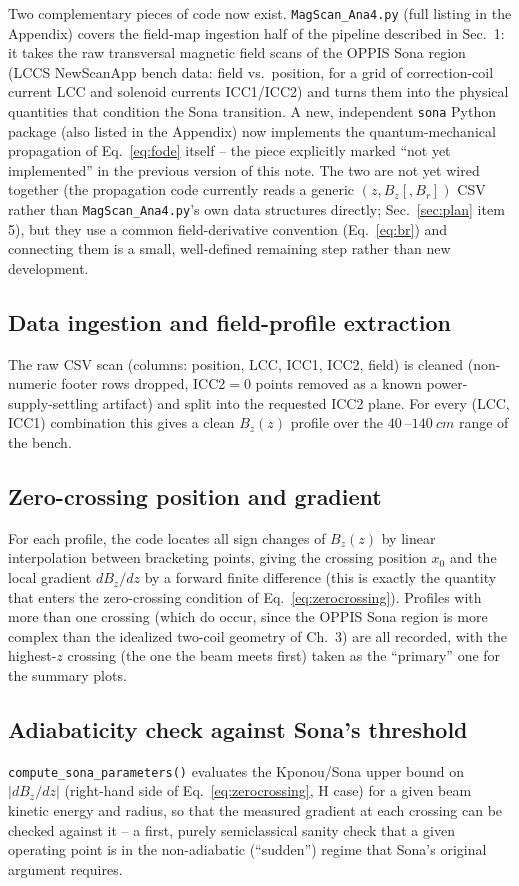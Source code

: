 \documentclass[11pt,a4paper]{article}
\begin{document}
Two complementary pieces of code now exist. \texttt{MagScan\_Ana4.py} (full
listing in the Appendix) covers the field-map ingestion half of the
pipeline described in Sec.~1: it takes the raw transversal magnetic field
scans of the OPPIS Sona region (LCCS NewScanApp bench data: field vs.\
position, for a grid of correction-coil current LCC and solenoid currents
ICC1/ICC2) and turns them into the physical quantities that condition the
Sona transition. A new, independent \texttt{sona} Python package (also
listed in the Appendix) now implements the quantum-mechanical propagation
of Eq.~\eqref{eq:fode} itself -- the piece explicitly marked ``not yet
implemented'' in the previous version of this note. The two are not yet
wired together (the propagation code currently reads a generic $(z,B_z[,B_r])$
CSV rather than \texttt{MagScan\_Ana4.py}'s own data structures directly;
Sec.~\ref{sec:plan} item 5), but they use a common field-derivative
convention (Eq.~\eqref{eq:br}) and connecting them is a small, well-defined
remaining step rather than new development.

\subsection{Data ingestion and field-profile extraction}
The raw CSV scan (columns: position, LCC, ICC1, ICC2, field) is cleaned
(non-numeric footer rows dropped, ICC2$=0$ points removed as a known
power-supply-settling artifact) and split into the requested ICC2 plane.
For every (LCC, ICC1) combination this gives a clean $B_z(z)$ profile over
the $\SI{40}{}$--$\SI{140}{cm}$ range of the bench.

\subsection{Zero-crossing position and gradient}
For each profile, the code locates all sign changes of $B_z(z)$ by linear
interpolation between bracketing points, giving the crossing position
$x_0$ and the local gradient $dB_z/dz$ by a forward finite difference (this
is exactly the quantity that enters the zero-crossing condition of
Eq.~\eqref{eq:zerocrossing}). Profiles with more than one crossing (which do
occur, since the OPPIS Sona region is more complex than the idealized
two-coil geometry of Ch.~3) are all recorded, with the highest-$z$ crossing
(the one the beam meets first) taken as the ``primary'' one for the summary
plots.

\subsection{Adiabaticity check against Sona's threshold}
\texttt{compute\_sona\_parameters()} evaluates the Kponou/Sona upper bound on
$|dB_z/dz|$ (right-hand side of Eq.~\eqref{eq:zerocrossing}, H case) for a
given beam kinetic energy and radius, so that the measured gradient at each
crossing can be checked against it -- a first, purely semiclassical sanity
check that a given operating point is in the non-adiabatic (``sudden'')
regime that Sona's original argument requires.
\end{document}
